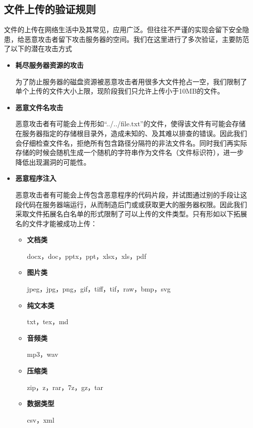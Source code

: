 \subsection{文件上传的验证规则}\label{sec:fileV}

文件的上传在网络生活中及其常见，应用广泛。但往往不严谨的实现会留下安全隐患，给恶意攻击者留下攻击服务器的空间。我们在这里进行了多次验证，主要防范了以下的潜在攻击方式
\begin{itemize}

	\item \textbf{耗尽服务器资源的攻击}
	
	为了防止服务器的磁盘资源被恶意攻击者用很多大文件抢占一空，我们限制了单个上传的文件大小上限，现阶段我们只允许上传小于10MB的文件。
	
	\item \textbf{恶意文件名攻击}
	
	恶意攻击者有可能会上传形如“../../file.txt”的文件，使得该文件有可能会存储在服务器指定的存储根目录外，造成未知的、及其难以排查的错误。因此我们会仔细检查文件名，拒绝所有包含路径分隔符的非法文件名。同时我们再实际存储的时候会随机生成一个随机的字符串作为文件名（文件标识符），进一步降低出现漏洞的可能性。
	
	\item \textbf{恶意程序注入}
	
	恶意攻击者有可能会上传包含恶意程序的代码片段，并试图通过别的手段让这段代码在服务器端运行，从而制造后门或或获取更大的服务器权限。因此我们采取文件拓展名白名单的形式限制了可以上传的文件类型。只有形如以下拓展名的文件才能被成功上传：
	\begin{itemize}
		\item \textbf{文档类}
		
		docx，doc，pptx，ppt，xlsx，xls，pdf
		
		\item \textbf{图片类}
		
		jpeg，jpg，png，gif，tiff，tif，raw，bmp，svg
		
		\item \textbf{纯文本类}
		
		txt，tex，md
		
		\item \textbf{音频类}
		
		mp3，wav
		
		\item \textbf{压缩类}
		
		zip，z，rar，7z，gz，tar
		
		\item \textbf{数据类型}
		
		csv，xml
	\end{itemize}

\end{itemize}


